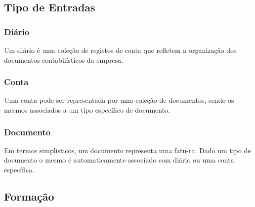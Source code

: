 \documentclass[sigplan]{acmart}
\begin{document}
\subsection{Tipo de Entradas}

\subsubsection{Diário}

Um diário é uma coleção de registos de conta que refletem a organização dos documentos contabilísticos da empresa.

\subsubsection{Conta}

Uma conta pode ser representada por uma coleção de documentos, sendo os mesmos associados a um tipo específico de documento.

\subsubsection{Documento}

Em termos simplisticos, um documento representa uma fatu-ra. Dado um tipo de documento o mesmo é automaticamente associado com diário ou uma conta específica.

\subsection{Formação}
\end{document}
